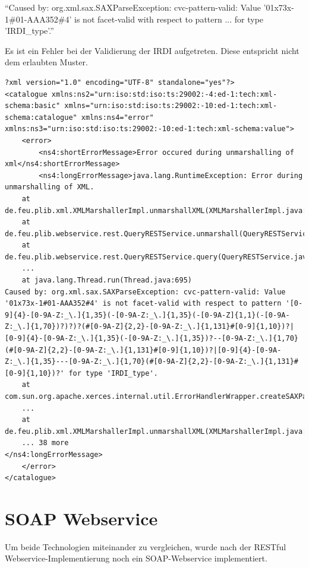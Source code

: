 \enquote{Caused by: org.xml.sax.SAXParseException: cvc-pattern-valid: Value '01x73x-1\#01-AAA352\#4' is not facet-valid with respect to pattern ... for type 'IRDI\_type'.}

Es ist ein Fehler bei der Validierung der IRDI aufgetreten. Diese entspricht nicht dem erlaubten Muster.

 \begin{lstlisting}[caption=Fehlerbehandlung - Beispielantwort mit Validierungsfehler=xml, label=lst:error_catalogue_beispiel]
?xml version="1.0" encoding="UTF-8" standalone="yes"?>
<catalogue xmlns:ns2="urn:iso:std:iso:ts:29002:-4:ed-1:tech:xml-schema:basic" xmlns="urn:iso:std:iso:ts:29002:-10:ed-1:tech:xml-schema:catalogue" xmlns:ns4="error" xmlns:ns3="urn:iso:std:iso:ts:29002:-10:ed-1:tech:xml-schema:value">
    <error>
        <ns4:shortErrorMessage>Error occured during unmarshalling of xml</ns4:shortErrorMessage>
        <ns4:longErrorMessage>java.lang.RuntimeException: Error during unmarshalling of XML.
	at de.feu.plib.xml.XMLMarshallerImpl.unmarshallXML(XMLMarshallerImpl.java:63)
	at de.feu.plib.webservice.rest.QueryRESTService.unmarshall(QueryRESTService.java:151)
	at de.feu.plib.webservice.rest.QueryRESTService.query(QueryRESTService.java:91)
	...
	at java.lang.Thread.run(Thread.java:695)
Caused by: org.xml.sax.SAXParseException: cvc-pattern-valid: Value '01x73x-1#01-AAA352#4' is not facet-valid with respect to pattern '[0-9]{4}-[0-9A-Z:_\.]{1,35}(-[0-9A-Z:_\.]{1,35}(-[0-9A-Z]{1,1}(-[0-9A-Z:_\.]{1,70})?)?)?(#[0-9A-Z]{2,2}-[0-9A-Z:_\.]{1,131}#[0-9]{1,10})?|[0-9]{4}-[0-9A-Z:_\.]{1,35}(-[0-9A-Z:_\.]{1,35})?--[0-9A-Z:_\.]{1,70}(#[0-9A-Z]{2,2}-[0-9A-Z:_\.]{1,131}#[0-9]{1,10})?|[0-9]{4}-[0-9A-Z:_\.]{1,35}---[0-9A-Z:_\.]{1,70}(#[0-9A-Z]{2,2}-[0-9A-Z:_\.]{1,131}#[0-9]{1,10})?' for type 'IRDI_type'.
	at com.sun.org.apache.xerces.internal.util.ErrorHandlerWrapper.createSAXParseException(ErrorHandlerWrapper.java:195)
	...
	at de.feu.plib.xml.XMLMarshallerImpl.unmarshallXML(XMLMarshallerImpl.java:57)
	... 38 more
</ns4:longErrorMessage>
    </error>
</catalogue>
\end{lstlisting} 

\section{SOAP Webservice}

Um beide Technologien miteinander zu vergleichen, wurde nach der \gls{REST}ful \gls{Webservice}-Implementierung noch ein \gls{SOAP}-\gls{Webservice} implementiert. 

